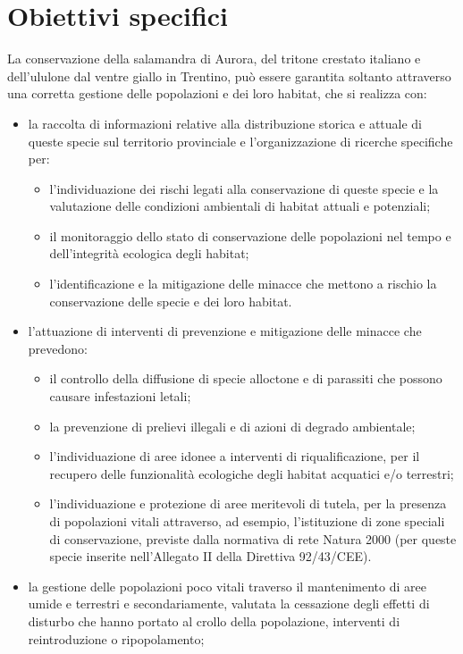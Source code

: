 \documentclass[10pt,twoside,openany,x11names,svgnames,italian,a5paper,dvipsnames,table]{memoir}
\begin{document}
\section{Obiettivi specifici}
La conservazione della salamandra di Aurora, del tritone crestato italiano e dell’ululone dal ventre giallo in Trentino, può essere garantita soltanto attraverso una corretta gestione delle popolazioni e dei loro habitat, che si realizza con:
\begin{itemize}\itemsep0pt
  \item la raccolta di informazioni relative alla distribuzione storica e attuale di queste specie sul territorio provinciale e l’organizzazione di ricerche specifiche per:
  \begin{itemize}\itemsep0pt 
    \item l’individuazione dei rischi legati alla conservazione di queste specie e la valutazione delle condizioni ambientali di habitat attuali e potenziali;
    \item il monitoraggio dello stato di conservazione delle popolazioni nel tempo e dell’integrità ecologica degli habitat;
    \item l’identificazione e la mitigazione delle minacce che mettono a rischio la conservazione delle specie e dei loro habitat.
  \end{itemize}
  \item l’attuazione di interventi di prevenzione e mitigazione delle minacce che prevedono: 
  \begin{itemize}\itemsep0pt
    \item il controllo della diffusione di specie alloctone e di parassiti che possono causare infestazioni letali; 
    \item la prevenzione di prelievi illegali e di azioni di degrado ambientale; 
    \item l’individuazione di aree idonee a interventi di riqualificazione, per il recupero delle funzionalità ecologiche degli habitat acquatici e/o terrestri;
    \item l’individuazione e protezione di aree meritevoli di tutela, per la presenza di popolazioni vitali attraverso, ad esempio, l’istituzione di zone speciali di conservazione, previste dalla normativa di rete Natura 2000 (per queste specie inserite nell'Allegato II della Direttiva 92/43/CEE).
  \end{itemize}
  \item la gestione delle popolazioni poco vitali traverso il mantenimento di aree umide e terrestri e secondariamente, valutata la cessazione degli effetti di disturbo che hanno portato al crollo della popolazione, interventi di reintroduzione o ripopolamento;

\end{itemize}
\end{document}
